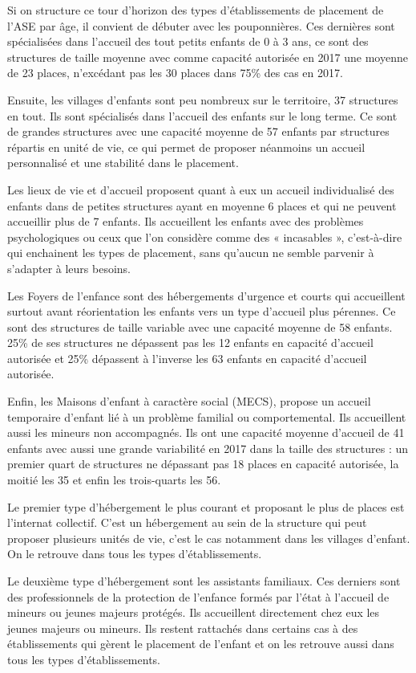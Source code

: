 \documentclass[
  12,
  a4paper,
]{report}
\begin{document}
Si on structure ce tour d'horizon des types d'établissements de
placement de l'ASE par âge, il convient de débuter avec les
pouponnières. Ces dernières sont spécialisées dans l'accueil des tout
petits enfants de 0 à 3 ans, ce sont des structures de taille moyenne
avec comme capacité autorisée en 2017 une moyenne de 23 places,
n'excédant pas les 30 places dans 75\% des cas en 2017.

Ensuite, les villages d'enfants sont peu nombreux sur le territoire, 37
structures en tout. Ils sont spécialisés dans l'accueil des enfants sur
le long terme. Ce sont de grandes structures avec une capacité moyenne
de 57 enfants par structures répartis en unité de vie, ce qui permet de
proposer néanmoins un accueil personnalisé et une stabilité dans le
placement.

Les lieux de vie et d'accueil proposent quant à eux un accueil
individualisé des enfants dans de petites structures ayant en moyenne 6
places et qui ne peuvent accueillir plus de 7 enfants. Ils accueillent
les enfants avec des problèmes psychologiques ou ceux que l'on considère
comme des « incasables », c'est-à-dire qui enchainent les types de
placement, sans qu'aucun ne semble parvenir à s'adapter à leurs besoins.

Les Foyers de l'enfance sont des hébergements d'urgence et courts qui
accueillent surtout avant réorientation les enfants vers un type
d'accueil plus pérennes. Ce sont des structures de taille variable avec
une capacité moyenne de 58 enfants. 25\% de ses structures ne dépassent
pas les 12 enfants en capacité d'accueil autorisée et 25\% dépassent à
l'inverse les 63 enfants en capacité d'accueil autorisée.

Enfin, les Maisons d'enfant à caractère social (MECS), propose un
accueil temporaire d'enfant lié à un problème familial ou
comportemental. Ils accueillent aussi les mineurs non accompagnés. Ils
ont une capacité moyenne d'accueil de 41 enfants avec aussi une grande
variabilité en 2017 dans la taille des structures : un premier quart de
structures ne dépassant pas 18 places en capacité autorisée, la moitié
les 35 et enfin les trois-quarts les 56.

Le premier type d'hébergement le plus courant et proposant le plus de
places est l'internat collectif. C'est un hébergement au sein de la
structure qui peut proposer plusieurs unités de vie, c'est le cas
notamment dans les villages d'enfant. On le retrouve dans tous les types
d'établissements.

Le deuxième type d'hébergement sont les assistants familiaux. Ces
derniers sont des professionnels de la protection de l'enfance formés
par l'état à l'accueil de mineurs ou jeunes majeurs protégés. Ils
accueillent directement chez eux les jeunes majeurs ou mineurs. Ils
restent rattachés dans certains cas à des établissements qui gèrent le
placement de l'enfant et on les retrouve aussi dans tous les types
d'établissements.
\end{document}
